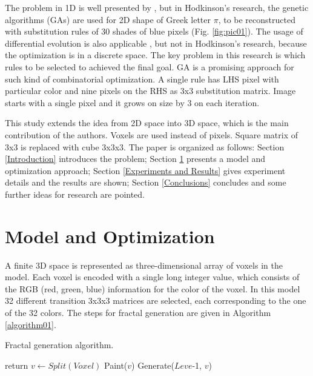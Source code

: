 \documentclass[runningheads]{llncs}
\begin{document}
The problem in 1D is well presented by \cite{shonkwiler01}, but in Hodkinson's research, the genetic algorithms (GAs) are used for 2D shape of Greek letter $\pi$, to be reconstructed with substitution rules of 30 shades of blue pixels (Fig. \ref{fig:pic01}). The usage of differential evolution is also applicable \cite{zelinka01}, but not in Hodkinson's research, because the optimization is in a discrete space.  The key problem in this research is which rules to be selected to achieved the final goal. GA is a promising approach for such kind of combinatorial optimization. A single rule has LHS pixel with particular color and nine pixels on the RHS as 3x3 substitution matrix. Image starts with a single pixel and it grows on size by 3 on each iteration. 

This study extends the idea from 2D space into 3D space, which is the main contribution of the authors. Voxels are used instead of pixels. Square matrix of 3x3 is replaced with cube 3x3x3. The paper is organized as follows: Section \ref{Introduction} introduces the problem; Section \ref{Model and Optimization} presents a model and optimization approach; Section \ref{Experiments and Results} gives experiment details and the results are shown; Section \ref{Conclusions} concludes and some further ideas for research are pointed.

\section{Model and Optimization} \label{Model and Optimization}

A finite 3D space is represented as three-dimensional array of voxels in the model. Each voxel is encoded with a single long integer value, which consists of the RGB (red, green, blue) information for the color of the voxel. In this model 32 different transition 3x3x3 matrices are selected, each corresponding to the one of the 32 colors. The steps for fractal generation are given in Algorithm \ref{algorithm01}.

\begin{algorithm}
\caption{Fractal generation algorithm.}\label{algorithm01}
\begin{algorithmic}[1]
  \State return\label{alg:step04}
\EndIf
\State $v\gets Split(Voxel)$\label{alg:step01}
  \State Paint($v$)\label{alg:step02}
  \State Generate($Leve$-1, $v$)\label{alg:step03}
\EndFor
\EndProcedure
\end{algorithmic}
\end{algorithm}
\FloatBarrier
\end{document}
